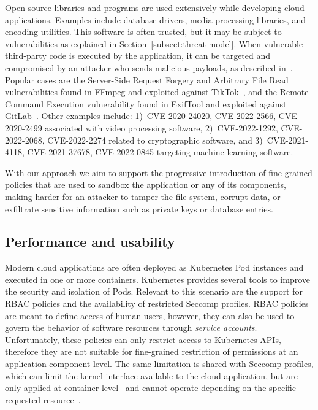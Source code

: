 Open source libraries and programs are used extensively while
developing cloud applications. Examples include database drivers,
media processing libraries, and encoding utilities.  This software is
often trusted, but it may be subject to vulnerabilities as explained
in Section~\ref{subsect:threat-model}.  When vulnerable third-party
code is executed by the application, it can be targeted and
compromised by an attacker who sends malicious payloads, as described
in~\cite{sanddriller-staicu, cage4deno, npm-malicious-update}.
Popular cases are the Server-Side Request Forgery and Arbitrary File
Read vulnerabilities found in FFmpeg and exploited against
TikTok~\cite{ffmpeg-exploit-example}, and the Remote Command Execution
vulnerability found in ExifTool and exploited against
GitLab~\cite{exiftool-exploit-example}. Other examples include:
1)~CVE-2020-24020, CVE-2022-2566, CVE-2020-2499 associated with video
processing software, 2)~CVE-2022-1292, CVE-2022-2068, CVE-2022-2274
related to cryptographic software, and 3)~CVE-2021-4118,
CVE-2021-37678, CVE-2022-0845 targeting machine learning software.

With our approach we aim to support the progressive introduction of
fine-grained policies that are used to sandbox the application or any
of its components, making harder for an attacker to tamper the file
system, corrupt data, or exfiltrate sensitive information such as
private keys or database entries.

\subsection{Performance and usability}

Modern cloud applications are often deployed as Kubernetes Pod
instances and executed in one or more containers. Kubernetes provides
several tools to improve the security and isolation of Pods. Relevant
to this scenario are the support for RBAC policies and the
availability of restricted Seccomp profiles. RBAC policies
are meant to define access of human users, however, they can also be used
to govern the behavior of software resources through {\em service
  accounts}. Unfortunately, these policies can only restrict access to
Kubernetes APIs, therefore they are not suitable for fine-grained
restriction of permissions at an application component level. The same
limitation is shared with Seccomp profiles, which can limit the kernel
interface available to the cloud application, but are only applied at
container level~\cite{k8s-seccomp} and cannot operate depending on the
specific requested resource~\cite{jia2023programmable}.

